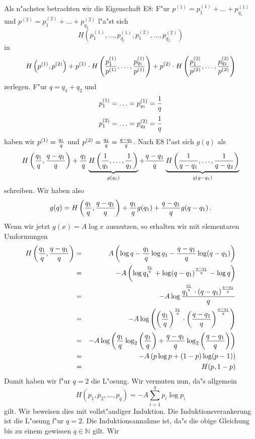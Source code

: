 \documentclass[10pt]{article}
\begin{document}
Als n"achstes betrachten wir die Eigenschaft E8: F"ur 
$p^{(1)}=p^{(1)}_1+\ldots +p^{(1)}_{q_1}$
und
$p^{(2)}=p^{(2)}_1+\ldots +p^{(2)}_{q_2}$ l"a"st sich 
$$ H\left(p^{(1)}_1,\ldots,p^{(1)}_{q_1},p^{(2)}_1,\ldots,p^{(2)}_{q_2}\right)
$$
in
$$ H\left(p^{(1)},p^{(2)}\right) + 
   p^{(1)}\cdot 
   H\left({p^{(1)}_1\over p^{(1)}},\ldots,{p^{(1)}_{q_1}\over p^{(1)}}\right) +
   p^{(2)}\cdot
   H\left({p^{(2)}_1\over p^{(2)}},\ldots,{p^{(2)}_{q_2}\over p^{(2)}}\right)
$$
zerlegen. F"ur $q=q_1+q_2$ und 
$$ p^{(1)}_1 = \ldots = p^{(1)}_{q_1} = {1\over q} $$
$$ p^{(2)}_1 = \ldots = p^{(2)}_{q_2} = {1\over q} $$
haben wir
$p^{(1)}={q_1\over q}$ und $p^{(2)}={q_2\over q} = {q-q_1\over q}$. Nach E8
l"ast sich $g(q)$ als 
$$ H\left({q_1\over q},{q-q_1\over q}\right) +
   {q_1\over q} 
   \underbrace{H\left({1\over q_1},\ldots,{1\over q_1}\right)}_{g(q_1)} +
   {q-q_1\over q} 
   \underbrace{H\left({1\over q-q_1},\ldots,{1\over q-q_2}\right)}_{g(q-q_1)}
$$
schreiben. Wir haben also
$$ g(q)=H\left({q_1\over q},{q-q_1\over q}\right)+
   {q_1\over q} g(q_1) + 
   {q-q_1\over q} g(q-q_1)\,. $$
Wenn wir jetzt $g(x)=A\log x$ ausnutzen, so erhalten wir mit elementaren
Umformungen
\begin{eqnarray*}
  H\left({q_1\over q},{q-q_1\over q}\right) 
  & = & 
  A\left(\log q - {q_1\over q}\log q_1 - {q-q_1\over q}\log (q-q_1)\right)\\
  & = &
  -A\left(\log q_1^{{q_1\over q}}+\log(q-q_1)^{{q-q_1\over q}}-\log q\right)\\
  & = &
  -A\log {q_1^{{q_1\over q}} \cdot (q-q_1)^{{q-q_1\over q}}\over q}\\
  & = &
  -A\log\left(
       \left({q_1\over q}\right)^{{q_1\over q}}
  \cdot\left({q-q_1\over q}\right)^{{q-q_1\over q}}
  \right) \\
  & = & 
  -A\log\left({q_1\over q}\log_2\left({q_1\over q}\right) +
              {q-q_1\over q}\log_2\left({q-q_1\over q}\right)
  \right) \\
  & = &
  -A\left(p\log p + (1-p)\log(p-1)\right) \\
  & = &
  H(p,1-p)
\end{eqnarray*}
Damit haben wir f"ur $q=2$ die L"osung.
Wir vermuten nun, da"s allgemein 
\begin{equation}
  H(p_1,p_2,\ldots,p_q) = -A \sum_{i=1}^q p_i\log p_i
\end{equation}
gilt. Wir beweisen dies mit vollst"andiger Induktion. Die 
Induktionsverankerung ist die L"osung f"ur $q=2$. Die Induktionsannahme ist,
da"s die obige Gleichung bis zu einem gewissen $q\in\mathbb{N}$ gilt. Wir
\end{document}
